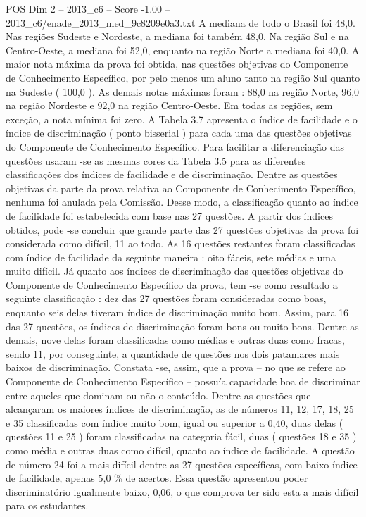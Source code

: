 \begin{textsample}{POS Dim 2 – 2013\_c6 – Score -1.00 – 2013\_c6/enade\_2013\_med\_9c8209e0a3.txt}
A mediana de todo o Brasil foi 48,0.
Nas regiões Sudeste e Nordeste, a mediana foi também 48,0.
Na região Sul e na Centro-Oeste, a mediana foi 52,0, enquanto na região Norte a mediana foi 40,0.
A maior nota máxima da prova foi obtida, nas questões objetivas do Componente de Conhecimento Específico, por pelo menos um aluno tanto na região Sul quanto na Sudeste ( 100,0 ).
As demais notas máximas foram : 88,0 na região Norte, 96,0 na região Nordeste e 92,0 na região Centro-Oeste.
Em todas as regiões, sem exceção, a nota mínima foi zero.
A Tabela 3.7 apresenta o índice de facilidade e o índice de discriminação ( ponto bisserial ) para cada uma das questões objetivas do Componente de Conhecimento Específico.
Para facilitar a diferenciação das questões usaram -se as mesmas cores da Tabela 3.5 para as diferentes classificações dos índices de facilidade e de discriminação.
Dentre as questões objetivas da parte da prova relativa ao Componente de Conhecimento Específico, nenhuma foi anulada pela Comissão.
Desse modo, a classificação quanto ao índice de facilidade foi estabelecida com base nas 27 questões.
A partir dos índices obtidos, pode -se concluir que grande parte das 27 questões objetivas da prova foi considerada como difícil, 11 ao todo.
As 16 questões restantes foram classificadas com índice de facilidade da seguinte maneira : oito fáceis, sete médias e uma muito difícil.
Já quanto aos índices de discriminação das questões objetivas do Componente de Conhecimento Específico da prova, tem -se como resultado a seguinte classificação : dez das 27 questões foram consideradas como boas, enquanto seis delas tiveram índice de discriminação muito bom.
Assim, para 16 das 27 questões, os índices de discriminação foram bons ou muito bons.
Dentre as demais, nove delas foram classificadas como médias e outras duas como fracas, sendo 11, por conseguinte, a quantidade de questões nos dois patamares mais baixos de discriminação.
Constata -se, assim, que a prova – no que se refere ao Componente de Conhecimento Específico – possuía capacidade boa de discriminar entre aqueles que dominam ou não o conteúdo.
Dentre as questões que alcançaram os maiores índices de discriminação, as de números 11, 12, 17, 18, 25 e 35 classificadas com índice muito bom, igual ou superior a 0,40, duas delas ( questões 11 e 25 ) foram classificadas na categoria fácil, duas ( questões 18 e 35 ) como média e outras duas como difícil, quanto ao índice de facilidade.
A questão de número 24 foi a mais difícil dentre as 27 questões específicas, com baixo índice de facilidade, apenas 5,0 \% de acertos.
Essa questão apresentou poder discriminatório igualmente baixo, 0,06, o que comprova ter sido esta a mais difícil para os estudantes.

\end{textsample}

